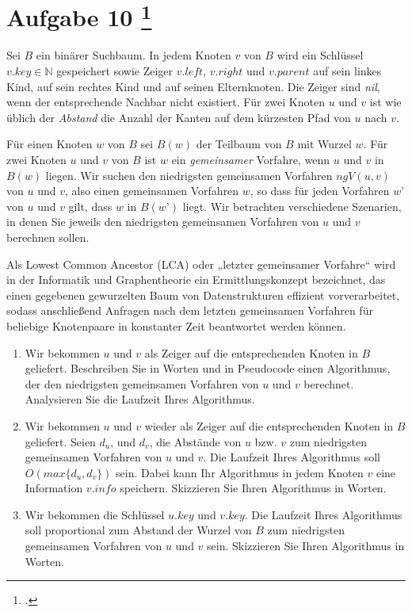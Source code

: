\documentclass{lehramt-informatik-aufgabe}
\begin{document}
\liAufgabenTitel{}
\section{Aufgabe 10
\footcite{66115:2020:03}}

Sei $B$ ein binärer Suchbaum. In jedem Knoten $v$ von $B$ wird ein
Schlüssel $v.key \in \mathbb{N}$ gespeichert sowie Zeiger $v.left$,
$v.right$ und $v.parent$ auf sein linkes Kind, auf sein rechtes Kind und
auf seinen Elternknoten. Die Zeiger sind \emph{nil}, wenn der
entsprechende Nachbar nicht existiert. Für zwei Knoten $u$ und $v$ ist
wie üblich der \emph{Abstand} die Anzahl der Kanten auf dem kürzesten
Pfad von $u$ nach $v$.

Für einen Knoten $w$ von $B$ sei $B(w)$ der Teilbaum von $B$ mit Wurzel
$w$. Für zwei Knoten $u$ und $v$ von $B$ ist $w$ ein \emph{gemeinsamer}
Vorfahre, wenn $u$ und $v$ in $B(w)$ liegen. Wir suchen den niedrigsten
gemeinsamen Vorfahren $ngV(u,v)$ von $u$ und $v$, also einen gemeinsamen
Vorfahren $w$, so dass für jeden Vorfahren $w’$ von $u$ und $v$ gilt,
dass $w$ in $B(w’)$ liegt. Wir betrachten verschiedene Szenarien, in
denen Sie jeweils den niedrigsten gemeinsamen Vorfahren von $u$ und $v$
berechnen sollen.

\begin{liExkurs}
Als Lowest Common Ancestor (LCA) oder „letzter gemeinsamer Vorfahre“
wird in der Informatik und Graphentheorie ein Ermittlungskonzept
bezeichnet, das einen gegebenen gewurzelten Baum von Datenstrukturen
effizient vorverarbeitet, sodass anschließend Anfragen nach dem letzten
gemeinsamen Vorfahren für beliebige Knotenpaare in konstanter Zeit
beantwortet werden können.
\end{liExkurs}

\begin{enumerate}


\item Wir bekommen $u$ und $v$ als Zeiger auf die entsprechenden Knoten
in $B$ geliefert. Beschreiben Sie in Worten und in Pseudocode einen
Algorithmus, der den niedrigsten gemeinsamen Vorfahren von $u$ und $v$
berechnet. Analysieren Sie die Laufzeit Ihres Algorithmus.

\item Wir bekommen $u$ und $v$ wieder als Zeiger auf die entsprechenden
Knoten in $B$ geliefert. Seien $d_u$, und $d_v$, die Abstände von $u$
bzw. $v$ zum niedrigsten gemeinsamen Vorfahren von $u$ und $v$. Die
Laufzeit Ihres Algorithmus soll $O(max\{d_u,d_v\})$ sein. Dabei kann Ihr
Algorithmus in jedem Knoten $v$ eine Information $v.info$ speichern.
Skizzieren Sie Ihren Algorithmus in Worten.


\item Wir bekommen die Schlüssel $u.key$ und $v.key$. Die Laufzeit Ihres
Algorithmus soll proportional zum Abstand der Wurzel von $B$ zum
niedrigsten gemeinsamen Vorfahren von $u$ und $v$ sein. Skizzieren Sie
Ihren Algorithmus in Worten.
\end{enumerate}
\end{document}
